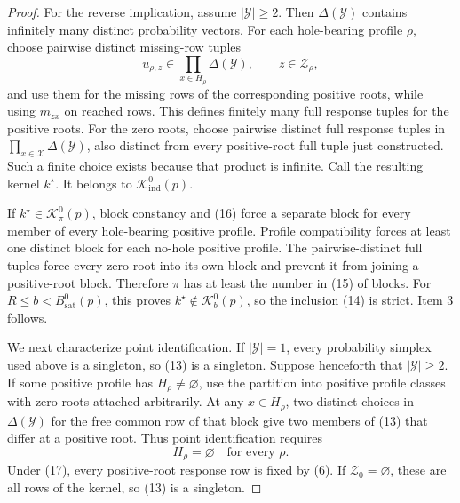 \documentclass{article}
\begin{document}
\begin{proof}
For the reverse implication, assume \(|\mathcal Y|\geq2\).  Then
\(\Delta(\mathcal Y)\) contains infinitely many distinct probability
vectors.  For each hole-bearing profile \(\rho\), choose pairwise
distinct missing-row tuples
\[
 u_{\rho,z}\in
 \prod_{x\in H_\rho}\Delta(\mathcal Y),
 \qquad z\in\mathcal Z_\rho,
\tag{16}
\]
and use them for the missing rows of the corresponding positive roots,
while using \(m_{zx}\) on reached rows.  This defines finitely many full
response tuples for the positive roots.  For the zero roots, choose
pairwise distinct full response tuples in
\(\prod_{x\in\mathcal X}\Delta(\mathcal Y)\), also distinct from every
positive-root full tuple just constructed.  Such a finite choice exists
because that product is infinite.  Call the resulting kernel \(k^\star\).
It belongs to \(\mathcal K_{\mathrm{ind}}^0(p)\).

If \(k^\star\in\mathcal K_\pi^0(p)\), block constancy and (16) force a
separate block for every member of every hole-bearing positive profile.
Profile compatibility forces at least one distinct block for each
no-hole positive profile.  The pairwise-distinct full tuples force every
zero root into its own block and prevent it from joining a positive-root
block.  Therefore \(\pi\) has at least the number in (15) of blocks.
For \(R\leq b<B_{\mathrm{sat}}^0(p)\), this proves
\(k^\star\notin\mathcal K_b^0(p)\), so the inclusion (14) is strict.
Item 3 follows.

We next characterize point identification.  If
\(|\mathcal Y|=1\), every probability simplex used above is a singleton,
so (13) is a singleton.  Suppose henceforth that
\(|\mathcal Y|\geq2\).  If some positive profile has
\(H_\rho\ne\varnothing\), use the partition into positive profile
classes with zero roots attached arbitrarily.  At any
\(x\in H_\rho\), two distinct choices in \(\Delta(\mathcal Y)\) for the
free common row of that block give two members of (13) that differ at a
positive root.  Thus point identification requires
\[
 H_\rho=\varnothing\quad\text{for every }\rho.
\tag{17}
\]
Under (17), every positive-root response row is fixed by (6).  If
\(\mathcal Z_0=\varnothing\), these are all rows of the kernel, so (13)
is a singleton.


\end{proof}
\end{document}
